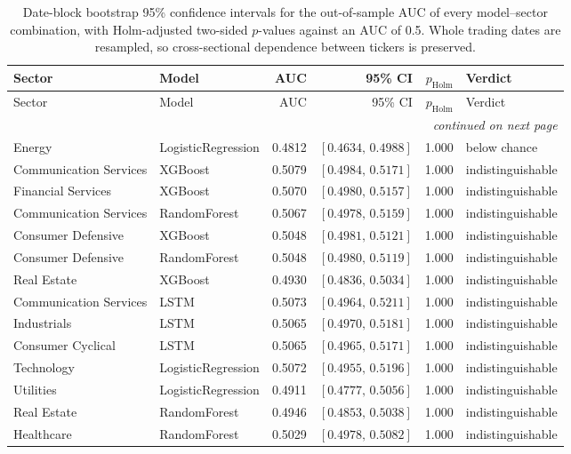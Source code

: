 \begin{longtable}{llrrrl}
\caption{Date-block bootstrap 95\% confidence intervals for the out-of-sample AUC of every model--sector combination, with Holm-adjusted two-sided $p$-values against an AUC of 0.5. Whole trading dates are resampled, so cross-sectional dependence between tickers is preserved.}\label{tab:ci}\\
\toprule
Sector & Model & AUC & 95\% CI & $p_{\text{Holm}}$ & Verdict \\
\midrule
\endfirsthead
\toprule
Sector & Model & AUC & 95\% CI & $p_{\text{Holm}}$ & Verdict \\
\midrule
\endhead
\midrule \multicolumn{6}{r}{\emph{continued on next page}}\\
\endfoot
\bottomrule
\endlastfoot
Energy & LogisticRegression & 0.4812 & $[0.4634,\,0.4988]$ & 1.000 & below chance \\
Communication Services & XGBoost & 0.5079 & $[0.4984,\,0.5171]$ & 1.000 & indistinguishable \\
Financial Services & XGBoost & 0.5070 & $[0.4980,\,0.5157]$ & 1.000 & indistinguishable \\
Communication Services & RandomForest & 0.5067 & $[0.4978,\,0.5159]$ & 1.000 & indistinguishable \\
Consumer Defensive & XGBoost & 0.5048 & $[0.4981,\,0.5121]$ & 1.000 & indistinguishable \\
Consumer Defensive & RandomForest & 0.5048 & $[0.4980,\,0.5119]$ & 1.000 & indistinguishable \\
Real Estate & XGBoost & 0.4930 & $[0.4836,\,0.5034]$ & 1.000 & indistinguishable \\
Communication Services & LSTM & 0.5073 & $[0.4964,\,0.5211]$ & 1.000 & indistinguishable \\
Industrials & LSTM & 0.5065 & $[0.4970,\,0.5181]$ & 1.000 & indistinguishable \\
Consumer Cyclical & LSTM & 0.5065 & $[0.4965,\,0.5171]$ & 1.000 & indistinguishable \\
Technology & LogisticRegression & 0.5072 & $[0.4955,\,0.5196]$ & 1.000 & indistinguishable \\
Utilities & LogisticRegression & 0.4911 & $[0.4777,\,0.5056]$ & 1.000 & indistinguishable \\
Real Estate & RandomForest & 0.4946 & $[0.4853,\,0.5038]$ & 1.000 & indistinguishable \\
Healthcare & RandomForest & 0.5029 & $[0.4978,\,0.5082]$ & 1.000 & indistinguishable \\

\end{longtable}
